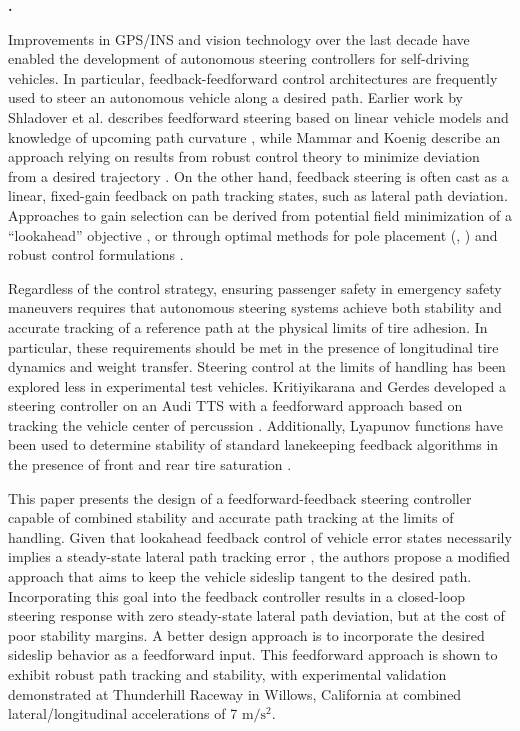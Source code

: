 \documentclass[10pt,a4paper]{article}
\def\section#1{\refstepcounter{section} \vspace{3.5mm} \noindent
{\normalsize\bf {\thesection.}} \hspace{0.5mm}{\normalsize\bf #1} \par \vspace{2mm}}
\begin{document}
\section{INTRODUCTION}
\label{sec:intro}

Improvements in GPS/INS and vision technology over the last decade have enabled the development of autonomous steering controllers for self-driving vehicles. In particular, feedback-feedforward control architectures are frequently used to steer an autonomous vehicle along a desired path.
Earlier work by Shladover et al. describes feedforward steering based on linear vehicle models and knowledge of upcoming path curvature \cite{shladover}, 
while Mammar and Koenig describe an approach relying on results from robust control theory to minimize deviation from a desired trajectory \cite{mammar}. On the other hand, feedback steering 
is often cast as a linear, fixed-gain feedback on path tracking states, such as lateral path deviation. Approaches to gain selection can be derived from potential 
field minimization of a “lookahead” objective \cite{hingwe}, or through optimal methods for pole placement (\cite{shladover}, \cite{enache}) and robust 
control formulations \cite{raharijana}.

Regardless of the control strategy, ensuring passenger safety in emergency safety maneuvers requires that autonomous steering systems achieve both 
stability and accurate tracking of a reference path at the physical limits of tire adhesion. In particular, these requirements should be met in the presence 
of longitudinal tire dynamics and weight transfer. Steering control at the limits of handling has been explored less in experimental test vehicles. Kritiyikarana
 and Gerdes developed a steering controller on an Audi TTS with a feedforward approach based on tracking the vehicle center of percussion \cite{mickcop}. 
 Additionally, Lyapunov functions have been used to determine stability of standard lanekeeping feedback algorithms in the presence of 
 front and rear tire saturation \cite{talvala}.
 
 This paper presents the design of a feedforward-feedback steering controller capable of combined stability and accurate path tracking at the limits of handling. Given that lookahead 
feedback control of vehicle error states necessarily implies a steady-state lateral path tracking error \cite{rajamani}, the authors 
propose a modified approach that aims to keep the vehicle sideslip tangent to the desired path. Incorporating this goal into the feedback controller results in a closed-loop steering
response with zero steady-state lateral path deviation, but at the cost of poor stability margins. A better design approach is to incorporate the desired sideslip behavior
as a feedforward input. This feedforward approach is shown to exhibit robust path tracking and stability, with experimental validation demonstrated
at Thunderhill Raceway in Willows, California at combined lateral/longitudinal accelerations of 7 $\mathrm{m/s^2}$.
\end{document}
